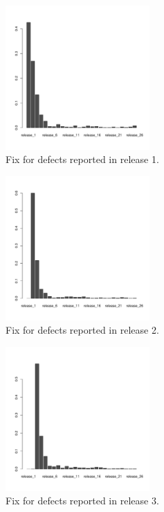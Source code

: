 \appendix{}
\label{sec:appendix_figure}

\begin{figure}[thb!]
      \caption{Fix for defects reported in release 1.}
      \label{fig:app_defect_release_1}
      \includegraphics[width=0.49\textwidth]{figures/r1}
\end{figure}

\begin{figure}[thb!]
      \caption{Fix for defects reported in release 2.}
      \label{fig:defect_release_2}
      \includegraphics[width=0.49\textwidth]{figures/r2}
\end{figure}

\begin{figure}[thb!]
      \caption{Fix for defects reported in release 3.}
      \label{fig:defect_release_3}
      \includegraphics[width=0.49\textwidth]{figures/r3}
\end{figure}

